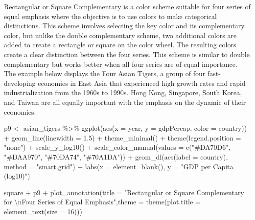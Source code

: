 \documentclass[
  letterpaper,
]{book}
\newenvironment{Shaded}{\begin{snugshade}}{\end{snugshade}}
\newcommand{\AttributeTok}[1]{\textcolor[rgb]{0.40,0.45,0.13}{#1}}
\newcommand{\DecValTok}[1]{\textcolor[rgb]{0.68,0.00,0.00}{#1}}
\newcommand{\FloatTok}[1]{\textcolor[rgb]{0.68,0.00,0.00}{#1}}
\newcommand{\FunctionTok}[1]{\textcolor[rgb]{0.28,0.35,0.67}{#1}}
\newcommand{\NormalTok}[1]{\textcolor[rgb]{0.00,0.23,0.31}{#1}}
\newcommand{\OtherTok}[1]{\textcolor[rgb]{0.00,0.23,0.31}{#1}}
\newcommand{\SpecialCharTok}[1]{\textcolor[rgb]{0.37,0.37,0.37}{#1}}
\newcommand{\StringTok}[1]{\textcolor[rgb]{0.13,0.47,0.30}{#1}}
\begin{document}
Rectangular or Square Complementary is a color scheme suitable for four
series of equal emphasis where the objective is to use colors to make
categorical distinctions. This scheme involves selecting the key color
and its complementary color, but unlike the double complementary scheme,
two additional colors are added to create a rectangle or square on the
color wheel. The resulting colors create a clear distinction between the
four series. This scheme is similar to double complementary but works
better when all four series are of equal importance. The example below
displays the Four Asian Tigers, a group of four fast-developing
economies in East Asia that experienced high growth rates and rapid
industrialization from the 1960s to 1990s. Hong Kong, Singapore, South
Korea, and Taiwan are all equally important with the emphasis on the
dynamic of their economies.

\begin{Shaded}
\begin{Highlighting}[]
\NormalTok{p9 }\OtherTok{\textless{}{-}}\NormalTok{ asian\_tigers }\SpecialCharTok{\%\textgreater{}\%} \FunctionTok{ggplot}\NormalTok{(}\FunctionTok{aes}\NormalTok{(}\AttributeTok{x =}\NormalTok{ year, }\AttributeTok{y =}\NormalTok{ gdpPercap, }\AttributeTok{color =}\NormalTok{ country)) }\SpecialCharTok{+} 
  \FunctionTok{geom\_line}\NormalTok{(}\AttributeTok{linewidth =} \FloatTok{1.5}\NormalTok{) }\SpecialCharTok{+} 
  \FunctionTok{theme\_minimal}\NormalTok{() }\SpecialCharTok{+} 
  \FunctionTok{theme}\NormalTok{(}\AttributeTok{legend.position =} \StringTok{"none"}\NormalTok{) }\SpecialCharTok{+}
  \FunctionTok{scale\_y\_log10}\NormalTok{() }\SpecialCharTok{+}
  \FunctionTok{scale\_color\_manual}\NormalTok{(}\AttributeTok{values =} \FunctionTok{c}\NormalTok{(}\StringTok{"\#DA70D6"}\NormalTok{, }\StringTok{"\#DAA970"}\NormalTok{, }\StringTok{"\#70DA74"}\NormalTok{, }\StringTok{"\#70A1DA"}\NormalTok{)) }\SpecialCharTok{+}
  \FunctionTok{geom\_dl}\NormalTok{(}\FunctionTok{aes}\NormalTok{(}\AttributeTok{label =}\NormalTok{ country), }\AttributeTok{method =} \StringTok{"smart.grid"}\NormalTok{) }\SpecialCharTok{+}
  \FunctionTok{labs}\NormalTok{(}\AttributeTok{x =} \FunctionTok{element\_blank}\NormalTok{(), }\AttributeTok{y =} \StringTok{"GDP per Capita (log10)"}\NormalTok{)}

\NormalTok{square }\SpecialCharTok{+}\NormalTok{ p9 }\SpecialCharTok{+} \FunctionTok{plot\_annotation}\NormalTok{(}\AttributeTok{title =} \StringTok{"Rectangular or Square Complementary for }\SpecialCharTok{\textbackslash{}n}\StringTok{Four Series of Equal Emphasis"}\NormalTok{,}\AttributeTok{theme =} \FunctionTok{theme}\NormalTok{(}\AttributeTok{plot.title =} \FunctionTok{element\_text}\NormalTok{(}\AttributeTok{size =} \DecValTok{16}\NormalTok{)))}
\end{Highlighting}
\end{Shaded}
\end{document}
